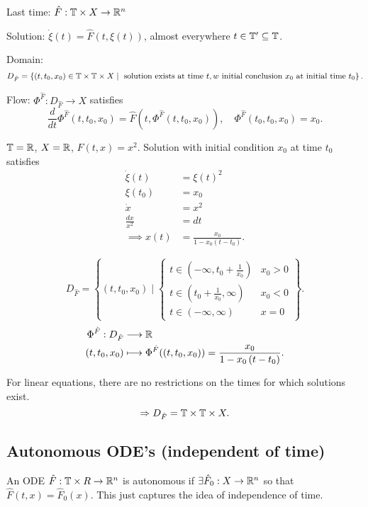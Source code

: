 
Last time: $\hat{F} : \mathbb{T} \times X  \to \mathbb{R}^{n}$ 

Solution: $\dot{\xi} \left( t \right) = \hat{F}\left( t, \xi \left( t \right)  \right) $, almost everywhere $t \in  \mathbb{T}' \subseteq \mathbb{T}$. 

Domain:
\[
D_{\hat{F}} = \left\{ \left( t, t_0, x_0 \right) \in \mathbb{T}\times \mathbb{T}\times X \\
\mid \text{ solution exists at time }t, w \text{ initial conclusion }x_0 \text{ at initial time } t_0\right\} 
.\] 

Flow: $\Phi ^{\hat{F}} : D_{\hat{F}} \to X$ satisfies 
\[
	\frac{d}{dt}\Phi ^{\hat{F}}\left( t, t_0, x_0 \right)  = \hat{F}\left( t, \Phi ^{\hat{F}}\left( t, t_0, x_0 \right)  \right) , \quad \Phi ^{\hat{F}}\left( t_0, t_0, x_0 \right)  = x_0
.\] 
\begin{example}
	$\mathbb{T} = \mathbb{R}$, $X = \mathbb{R}$, $\hat{F}\left( t, x \right) = x^2$. Solution with initial condition $x_0$ at time $t_0$ satisfies 
	\begin{align*}
		\dot{\xi }\left( t \right)  &=  \xi \left( t \right) ^2 \\
		\xi \left( t_0 \right) &= x_0 \\
		\dot{x} &= x^2 \\
		\frac{dx}{x^2} &= dt \\
		\implies x\left( t \right) &= \frac{x_0}{1 - x_0\left( t - t_0 \right) } 
	.\end{align*}

	\[
		D_{\hat{F}} = \left\{ \left( t, t_0, x_0 \right)  \mid \begin{cases}
				t \in \left( -\infty, t_0 + \frac{1}{x_0} \right) & x_0 > 0 \\
				t \in  \left( t_0 + \frac{1}{x_0}, \infty \right) & x_0 < 0 \\
				t \in  \left( -\infty, \infty \right)  & x = 0
		\end{cases} \right\} 
	.\] 
	\begin{align*}
		\Phi ^{\hat{F}}: D_{\hat{F}} &\longrightarrow \mathbb{R} \\
		\left( t, t_0, x_0 \right)  &\longmapsto \Phi ^{\hat{F}}(\left( t, t_0, x_0 \right) ) = \frac{x_0}{1 - x_0\left( t - t_0 \right) }
	.\end{align*}
\end{example}

For linear equations, there are no restrictions on the times for which solutions exist.
\[
\Rightarrow D_{\hat{F}} = \mathbb{T} \times  \mathbb{T} \times  X 
.\] 

\subsection{Autonomous ODE's (independent of time)}

An ODE $\hat{F} : \mathbb{T} \times  R  \to \mathbb{R} ^{n} $ is autonomous if $\exists  \hat{F}_{0} : X  \to \mathbb{R}^{n}$ so that $\hat{F}\left( t, x \right) = \hat{F} _{0}\left( x \right) $. This just captures the idea of independence of time. 
